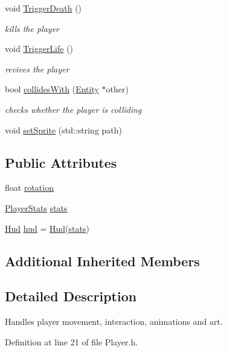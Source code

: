 \begin{DoxyCompactItemize}
void \hyperlink{class_player_a14d08591258cea6406002cda8a075917}{Trigger\+Death} ()
\begin{DoxyCompactList}\small\item\em kills the player \end{DoxyCompactList}\item 
void \hyperlink{class_player_aa1452815f38bc6b069f2fda6819b2887}{Trigger\+Life} ()
\begin{DoxyCompactList}\small\item\em revives the player \end{DoxyCompactList}\item 
bool \hyperlink{class_player_a2c1775f5add97e680e7cd538e8dddda3}{collides\+With} (\hyperlink{class_entity}{Entity} $\ast$other)
\begin{DoxyCompactList}\small\item\em checks whether the player is colliding \end{DoxyCompactList}\item 
void \hyperlink{class_player_acf54fe649339974ec2f990f2f484dc3d}{set\+Sprite} (std\+::string path)
\end{DoxyCompactItemize}
\subsection*{Public Attributes}
\begin{DoxyCompactItemize}
\item 
float \hyperlink{class_player_ad94d3e5ab67795f8f848a7fd565f376f}{rotation}
\item 
\hyperlink{struct_player_stats}{Player\+Stats} \hyperlink{class_player_af9bb9d1de3b674a869b2c58b702e9036}{stats}
\item 
\hyperlink{class_hud}{Hud} \hyperlink{class_player_a53a16e90cfe0982879f2f993ee2c7e88}{hud} = \hyperlink{class_hud}{Hud}(\hyperlink{class_player_af9bb9d1de3b674a869b2c58b702e9036}{stats})
\end{DoxyCompactItemize}
\subsection*{Additional Inherited Members}


\subsection{Detailed Description}
Handles player movement, interaction, animations and art. 

Definition at line 21 of file Player.\+h.



